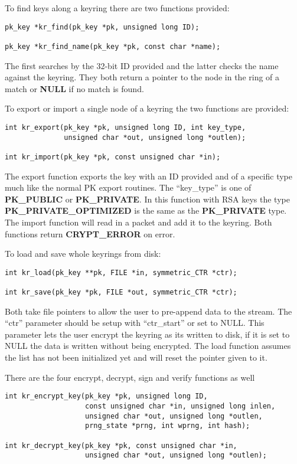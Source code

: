 \documentclass{book}
\begin{document}
To find keys along a keyring there are two functions provided:
\begin{verbatim}
pk_key *kr_find(pk_key *pk, unsigned long ID);

pk_key *kr_find_name(pk_key *pk, const char *name);
\end{verbatim}
The first searches by the 32-bit ID provided and the latter checks the name against the keyring.  They both return a pointer
to the node in the ring of a match or {\bf NULL} if no match is found.

To export or import a single node of a keyring the two functions are provided:
\begin{verbatim}
int kr_export(pk_key *pk, unsigned long ID, int key_type, 
              unsigned char *out, unsigned long *outlen);

int kr_import(pk_key *pk, const unsigned char *in);
\end{verbatim}
The export function exports the key with an ID provided and of a specific type much like the normal PK export routines.  The
``key\_type'' is one of {\bf PK\_PUBLIC} or {\bf PK\_PRIVATE}.  In this function with RSA keys the type 
{\bf PK\_PRIVATE\_OPTIMIZED} is the same as the {\bf PK\_PRIVATE} type.  The import function will read in a packet and 
add it to the keyring.  Both functions return {\bf CRYPT\_ERROR} on error.

To load and save whole keyrings from disk:
\begin{verbatim}
int kr_load(pk_key **pk, FILE *in, symmetric_CTR *ctr);

int kr_save(pk_key *pk, FILE *out, symmetric_CTR *ctr);
\end{verbatim}
Both take file pointers to allow the user to pre-append data to the stream.  The ``ctr'' parameter should be setup with 
``ctr\_start'' or set to NULL.  This parameter lets the user encrypt the keyring as its written to disk, if it is set
to NULL the data is written without being encrypted.  The load function assumes the list has not been initialized yet 
and will reset the pointer given to it.

There are the four encrypt, decrypt, sign and verify functions as well
\begin{verbatim}
int kr_encrypt_key(pk_key *pk, unsigned long ID, 
                   const unsigned char *in, unsigned long inlen,
                   unsigned char *out, unsigned long *outlen,
                   prng_state *prng, int wprng, int hash);

int kr_decrypt_key(pk_key *pk, const unsigned char *in,
                   unsigned char *out, unsigned long *outlen);
\end{verbatim}
\end{document}
